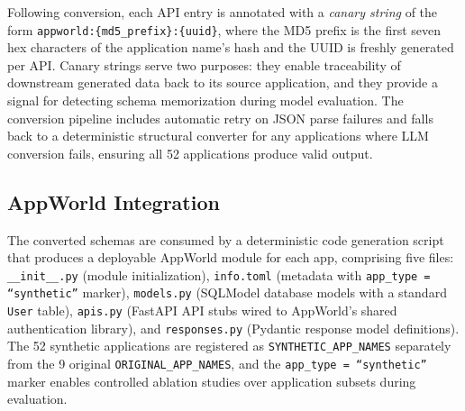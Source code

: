 Following conversion, each API entry is annotated with a \emph{canary string} of the form \texttt{appworld:\{md5\_prefix\}:\{uuid\}}, where the MD5 prefix is the first seven hex characters of the application name's hash and the UUID is freshly generated per API. Canary strings serve two purposes: they enable traceability of downstream generated data back to its source application, and they provide a signal for detecting schema memorization during model evaluation. The conversion pipeline includes automatic retry on JSON parse failures and falls back to a deterministic structural converter for any applications where LLM conversion fails, ensuring all 52 applications produce valid output.

\subsection{AppWorld Integration}

The converted schemas are consumed by a deterministic code generation script that produces a deployable AppWorld module for each app, comprising five files: \texttt{\_\_init\_\_.py} (module initialization), \texttt{info.toml} (metadata with \texttt{app\_type = ``synthetic''} marker), \texttt{models.py} (SQLModel database models with a standard \texttt{User} table), \texttt{apis.py} (FastAPI API stubs wired to AppWorld's shared authentication library), and \texttt{responses.py} (Pydantic response model definitions). The 52 synthetic applications are registered as \texttt{SYNTHETIC\_APP\_NAMES} separately from the 9 original \texttt{ORIGINAL\_APP\_NAMES}, and the \texttt{app\_type = ``synthetic''} marker enables controlled ablation studies over application subsets during evaluation.






